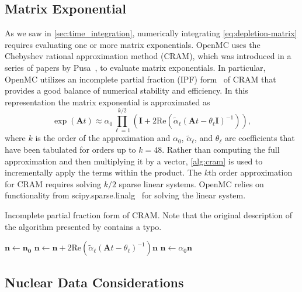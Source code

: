 \documentclass[3p,authoryear]{elsarticle}
\newcommand{\vect}[1]{\mathbf{#1}} %
\begin{document}
\subsection{Matrix Exponential}

As we saw in \cref{sec:time_integration}, numerically integrating
\cref{eq:depletion-matrix} requires evaluating one or more matrix exponentials.
OpenMC uses the Chebyshev rational approximation method (CRAM), which was
introduced in a series of papers by Pusa~\citep{pusa2010nse,pusa2011nse}, to
evaluate matrix exponentials. In particular, OpenMC utilizes an incomplete
partial fraction (IPF) form~\citep{pusa2016nse} of CRAM that provides a good
balance of numerical stability and efficiency. In this representation the matrix
exponential is approximated as
\begin{equation}
    \exp(\vect{A}t) \approx \alpha_0 \prod\limits_{\ell=1}^{k/2} \left (
    \vect{I} + 2 \text{Re} \left ( \widetilde{\alpha}_\ell \left (\vect{A}t
    - \theta_\ell \vect{I} \right )^{-1} \right ) \right ),
\end{equation}
where $k$ is the order of the approximation and $\alpha_0$,
$\widetilde{\alpha}_\ell$, and $\theta_\ell$ are coefficients that have been
tabulated for orders up to $k=48$. Rather than computing the full approximation
and then multiplying it by a vector, \cref{alg:cram} is used to incrementally
apply the terms within the product. The $k$th order approximation for CRAM
requires solving $k/2$ sparse linear systems. OpenMC relies on functionality
from scipy.sparse.linalg~\citep{virtanen2020nm} for solving the linear system.
\begin{algorithm}[H]
  \caption{Incomplete partial fraction form of CRAM. Note that the original
  description of the algorithm presented by \citet{pusa2016nse} contains a
  typo.}
  \label{alg:cram}
  \begin{algorithmic}
    \State $\vect{n} \gets \vect{n_0}$
      \State $\vect{n} \gets \vect{n} + 2\text{Re}(\widetilde{\alpha}_\ell
        (\vect{A}t - \theta_\ell)^{-1})\vect{n}$
    \EndFor
    \State $\vect{n} \gets \alpha_0 \vect{n}$
  \end{algorithmic}
\end{algorithm}

\subsection{Nuclear Data Considerations}
\end{document}
